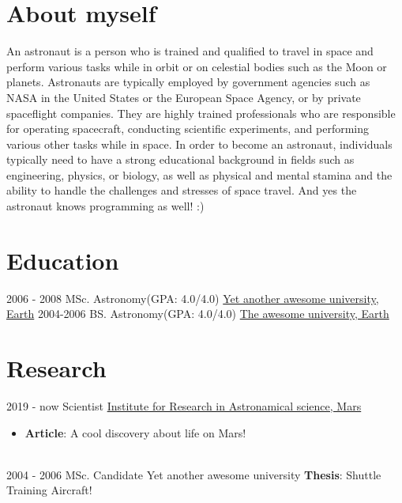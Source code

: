 \initcv
\makeprofile
\section*{About myself}
An astronaut is a person who is trained and qualified to travel in space and perform various tasks while in orbit or on celestial bodies such as the Moon or planets. Astronauts are typically employed by government agencies such as NASA in the United States or the European Space Agency, or by private spaceflight companies. They are highly trained professionals who are responsible for operating spacecraft, conducting scientific experiments, and performing various other tasks while in space. In order to become an astronaut, individuals typically need to have a strong educational background in fields such as engineering, physics, or biology, as well as physical and mental stamina and the ability to handle the challenges and stresses of space travel. And yes the astronaut knows programming as well! :)


\section*{Education}

\begin{twenty} %
	\twentyitem
	{2006 - 2008}
	{}
	{MSc. Astronomy\textnormal{(GPA: 4.0/4.0)}}
	{\href{http://www.astronomy.com/}{Yet another awesome university, Earth}}
	{}
	{}
	\twentyitem
	{2004-2006}
	{}
	{BS. Astronomy\textnormal{(GPA: 4.0/4.0)}}
	{\href{http://www.astronomy.com/}{The awesome university, Earth}}
	{}
	{}
\end{twenty}


\section*{Research}
\begin{twenty}
	\twentyitem
	{2019 - now}
	{}
	{Scientist}
	{\href{http://www.astronomy.com/}{Institute for Research in Astronamical science, Mars}}
	{}
	{
		{\begin{itemize}
					\item \textbf{Article}: A cool discovery about life on Mars!
				\end{itemize}}
	} \\

	\twentyitem
	{2004 - 2006}
	{}
	{MSc. Candidate}
	{{Yet another awesome university}}
	{}
	{
		\textbf{Thesis}: Shuttle Training Aircraft!
	}
\end{twenty}


